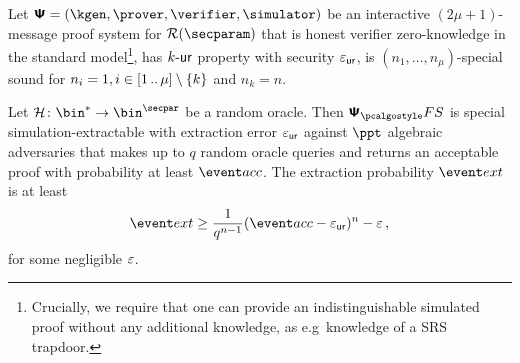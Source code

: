 \documentclass[runningheads,11pt]{llncs}
\begin{document}
\begin{theorem}
  \label{thm:se}
  Let $\ps = (\kgen, \prover, \verifier, \simulator)$ be an interactive
  $(2 \mu + 1)$-message proof system for $\RELGEN(\secparam)$ that is honest
  verifier zero-knowledge in the standard model\footnote{Crucially, we require
    that one can provide an indistinguishable simulated proof without any
    additional knowledge, as e.g~knowledge of a SRS trapdoor.}, has ${k\text{-}\mathsf{ur}}$
  property with security $\varepsilon_{\mathsf{ur}}$, is $(n_1, \ldots, n_\mu)$-special sound for
  $n_i = 1, i \in [1 \, .. \, \mu] \setminus \{k\}$ and $n_k = n$.

Let $\ro\colon \bin^{*} \to \bin^{\secpar}$ be a random oracle. 
Then $\psfs$ is special simulation-extractable with extraction error $\varepsilon_{\mathsf{ur}}$
against $\ppt$ algebraic adversaries that makes up to $q$ random oracle queries and
returns an acceptable proof with probability at least $\accProb$. 
The extraction probability $\extProb$ is at least
\[
	\extProb \geq \frac{1}{q^{n - 1}} (\accProb - \epsur)^{n} -\eps\,,
\]
for some negligible $\varepsilon$.	
\end{theorem}
\end{document}
